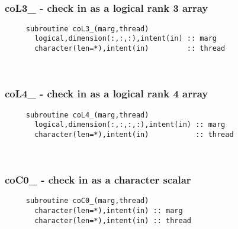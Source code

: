  
\mbox{}\hrulefill\ 
 
  \subsubsection{coL3\_ - check in as a logical rank 3 array}

\begin{verbatim} 
     subroutine coL3_(marg,thread)
       logical,dimension(:,:,:),intent(in) :: marg
       character(len=*),intent(in)         :: thread
 \end{verbatim}%
 
 
\mbox{}\hrulefill\ 

  \subsubsection{coL4\_ - check in as a logical rank 4 array}

\begin{verbatim} 
     subroutine coL4_(marg,thread)
       logical,dimension(:,:,:,:),intent(in) :: marg
       character(len=*),intent(in)           :: thread
 \end{verbatim}%
 
 
\mbox{}\hrulefill\ 
 
  \subsubsection{coC0\_ - check in as a character scalar}

\begin{verbatim} 
     subroutine coC0_(marg,thread)
       character(len=*),intent(in) :: marg
       character(len=*),intent(in) :: thread
 \end{verbatim}%
 
